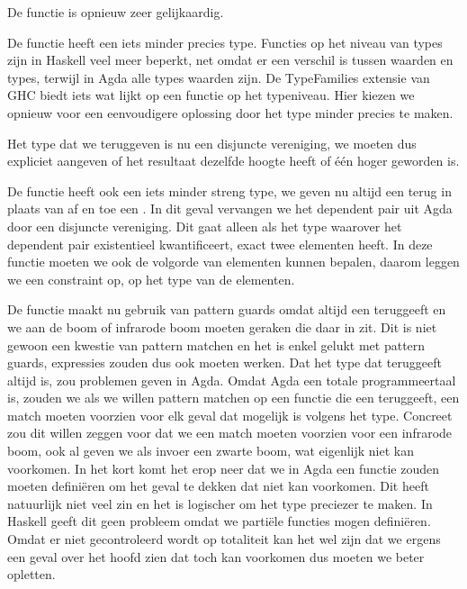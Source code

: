 De  functie is opnieuw zeer gelijkaardig.


De functie  heeft een iets minder precies type. Functies op het
niveau van types zijn in Haskell veel meer beperkt, net omdat er een verschil
is tussen waarden en types, terwijl in Agda alle types waarden zijn. De
TypeFamilies extensie \cite{typefam} van GHC biedt iets wat lijkt op een
functie op het typeniveau. Hier kiezen we opnieuw voor een eenvoudigere
oplossing door het type minder precies te maken.


Het type dat we teruggeven is nu een disjuncte vereniging, we moeten dus
expliciet aangeven of het resultaat dezelfde hoogte heeft of één hoger geworden
is.

De  functie heeft ook een iets minder streng type, we geven nu
altijd een  terug in plaats van af en toe een . In
dit geval vervangen we het dependent pair uit Agda door een disjuncte
vereniging. Dit gaat alleen als het type waarover het dependent pair
existentieel kwantificeert, exact twee elementen heeft. In deze functie moeten
we ook de volgorde van elementen kunnen bepalen, daarom leggen we een
 constraint op, op het type van de elementen.


De functie maakt nu gebruik van pattern guards \cite{patguard} omdat
 altijd een  teruggeeft en we aan de boom of
infrarode boom moeten geraken die daar in zit. Dit is niet gewoon een kwestie
van pattern matchen en het is enkel gelukt met pattern guards, 
expressies zouden dus ook moeten werken. Dat het type dat 
teruggeeft altijd  is, zou problemen geven in Agda. Omdat Agda
een totale programmeertaal is, zouden we als we willen pattern matchen op een
functie die een  teruggeeft, een match moeten voorzien voor elk
geval dat mogelijk is volgens het type. Concreet zou dit willen zeggen voor
 dat we een match moeten voorzien voor een infrarode boom, ook al
geven we als invoer een zwarte boom, wat eigenlijk niet kan voorkomen. In het
kort komt het erop neer dat we in Agda een functie zouden moeten definiëren om
het geval te dekken dat niet kan voorkomen. Dit heeft natuurlijk niet veel zin
en het is logischer om het type preciezer te maken. In Haskell geeft dit geen
probleem omdat we partiële functies mogen definiëren. Omdat er niet
gecontroleerd wordt op totaliteit kan het wel zijn dat we ergens een geval over
het hoofd zien dat toch kan voorkomen dus moeten we beter opletten.

